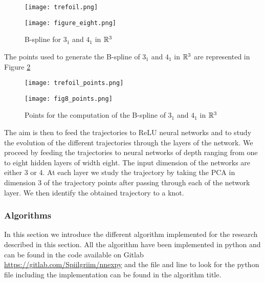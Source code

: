 \documentclass[12pt, a4paper]{article}
\begin{document}
\begin{figure}[H]
  \begin{minipage}[c]{.5\linewidth}
             \centering
            \texttt{[image: trefoil.png]}
         \end{minipage}
         \hfill%
         \begin{minipage}[c]{.5\linewidth}
             \centering
             \texttt{[image: figure\_eight.png]}
        \end{minipage}
        \caption{B-spline for $3_1$ and $4_1$ in $\mathbb{R}^3$}
        \label{fig:knot_bspline}
\end{figure}

The points used to generate the B-spline of $3_1$ and $4_1$ in $\mathbb{R}^3$ are represented in Figure \ref{fig:bspline_points}

\begin{figure}[H]
  \begin{minipage}[c]{.5\linewidth}
             \centering
            \texttt{[image: trefoil\_points.png]}
         \end{minipage}
         \hfill%
         \begin{minipage}[c]{.5\linewidth}
             \centering
             \texttt{[image: fig8\_points.png]}
        \end{minipage}
        \caption{Points for the computation of the B-spline of $3_1$ and $4_1$ in $\mathbb{R}^3$}
        \label{fig:bspline_points}
\end{figure}

The aim is then to feed the trajectories to ReLU neural networks and to study the evolution of the different trajectories through the layers of the network. We proceed by feeding the trajectories to neural networks of depth ranging from one to eight hidden layers of width eight. The input dimension of the networks are either 3 or 4. At each layer we study the trajectory by taking the PCA in dimension 3 of the trajectory points after passing through each of the network layer. We then identify the obtained trajectory to a knot.\\

\subsubsection{Algorithms}

In this section we introduce the different algorithm implemented for the research described in this section. All the algorithm have been implemented in python and can be found in the code available on Gitlab \url{https://gitlab.com/Spiilgriim/nnexpy} and the file and line to look for the python file including the implementation can be found in the algorithm title.\\
\end{document}
